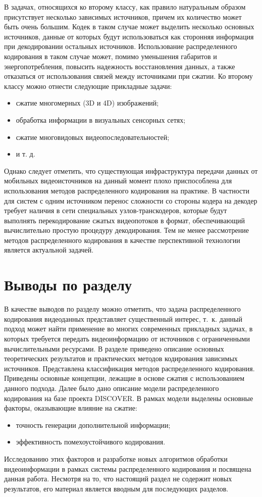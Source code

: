 В задачах, относящихся ко второму классу, как правило натуральным образом присутствует несколько зависимых источников, причем их количество может быть очень большим. Кодек в таком случае может выделить несколько основных источников, данные от которых будут использоваться как сторонняя информация при декодировании остальных источников. Использование распределенного кодирования в таком случае может, помимо уменьшения габаритов и энергопотребления, повысить надежность восстановления данных, а также отказаться от использования связей между источниками при сжатии. Ко второму классу можно отнести следующие прикладные задачи:

\begin{itemize}
\item сжатие многомерных (3D и 4D) изображений;
\item обработка информации в визуальных сенсорных сетях;
\item сжатие многовидовых видеопоследовательностей;
\item и т. д.
\end{itemize}

Однако следует отметить, что существующая инфраструктура передачи данных от мобильных видеоисточников на данный момент плохо приспособлена для использования методов распределенного кодирования на практике. В частности для систем с одним источником перенос сложности со стороны кодера на декодер требует наличия в сети специальных узлов-транскодеров, которые будут выполнять перекодирование сжатых видеопотоков в формат, обеспечивающий вычислительно простую процедуру декодирования. Тем не менее рассмотрение методов распределенного кодирования в качестве перспективной технологии является актуальной задачей.

\section{Выводы по разделу}

В качестве выводов по разделу можно отметить, что задача распределенного кодирования видеоданных представляет существенный интерес, т.~к. данный подход может найти применение во многих современных прикладных задачах, в которых требуется передать видеоинформацию от источников с ограниченными вычислительными ресурсами. В разделе приведено описание основных теоретических результатов и практических методов кодирования зависимых источников. Представлена классификация методов распределенного кодирования. Приведены основные концепции, лежащие в основе сжатия с использованием данного подхода. Далее было дано описание модели распределенного кодирования на базе проекта DISCOVER. В рамках модели выделены основные факторы, оказывающие влияние на сжатие:
\begin{itemize}
    \item точность генерации дополнительной информации;
    \item эффективность помехоустойчивого кодирования.
\end{itemize}
Исследованию этих факторов и разработке новых алгоритмов обработки видеоинформации в рамках системы распределенного кодирования и посвящена данная работа. Несмотря на то, что настоящий раздел не содержит новых результатов, его материал является вводным для последующих разделов.